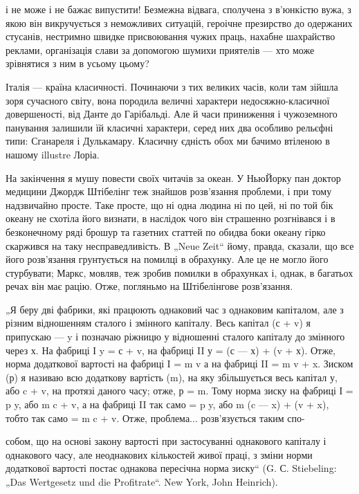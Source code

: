і не може і не бажає випустити! Безмежна відвага, сполучена
з в’юнкістю вужа, з якою він викручується з неможливих ситуацій,
героічне презирство до одержаних стусанів, нестримно швидке
присвоювання чужих праць, нахабне шахрайство реклами, організація
слави за допомогою шумихи приятелів — хто може зрівнятися
з ним в усьому цьому?

Італія — країна класичності. Починаючи з тих великих часів,
коли там зійшла зоря сучасного світу, вона породила величні
характери недосяжно-класичної довершеності, від Данте до
Гарібальді. Але й часи приниження і чужоземного панування
залишили їй класичні характери, серед них два особливо рельєфні
типи: Сганареля і Дулькамару. Класичну єдність обох ми
бачимо втіленою в нашому illustre Лоріа.

На закінчення я мушу повести своїх читачів за океан. У НьюЙорку
пан доктор медицини Джордж Штібелінг теж знайшов
розв’язання проблеми, і при тому надзвичайно просте. Таке
просте, що ні одна людина ні по цей, ні по той бік океану не
схотіла його визнати, в наслідок чого він страшенно розгнівався
і в безконечному ряді брошур та газетних статтей по обидва
боки океану гірко скаржився на таку несправедливість. В „Neue
Zeit“ йому, правда, сказали, що все його розв’язання грунтується
на помилці в обрахунку. Але це не могло його стурбувати;
Маркс, мовляв, теж зробив помилки в обрахунках і, однак,
в багатьох речах він має рацію. Отже, погляньмо на Штібелінгове
розв’язання.

„Я беру дві фабрики, які працюють однаковий час з однаковим
капіталом, але з різним відношенням сталого і змінного
капіталу. Весь капітал (с + v) я припускаю — y і позначаю ріжницю
у відношенні сталого капіталу до змінного через х. На
фабриці І y = с + v, на фабриці II у = (с — х) + (v + х). Отже,
норма додаткової вартості на фабриці І = m v а на фабриці II =
m v + x. Зиском (р) я називаю всю додаткову вартість (m), на
яку збільшується весь капітал у, або c + v, на протязі даного
часу; отже, р = m. Тому норма зиску на фабриці І = p y, або
m c + v, а на фабриці II так само = p y, або m (c — x) + (v + x), тобто
так само = m c + v. Отже, проблема... розв’язується таким спо-

собом, що на основі закону вартості при застосуванні однакового
капіталу і однакового часу, але неоднакових кількостей
живої праці, з зміни норми додаткової вартості постає однакова
пересічна норма зиску“ (G. С. Stiebeling: „Das Wertgesetz und die
Profitrate“. New York, John Heinrich).
